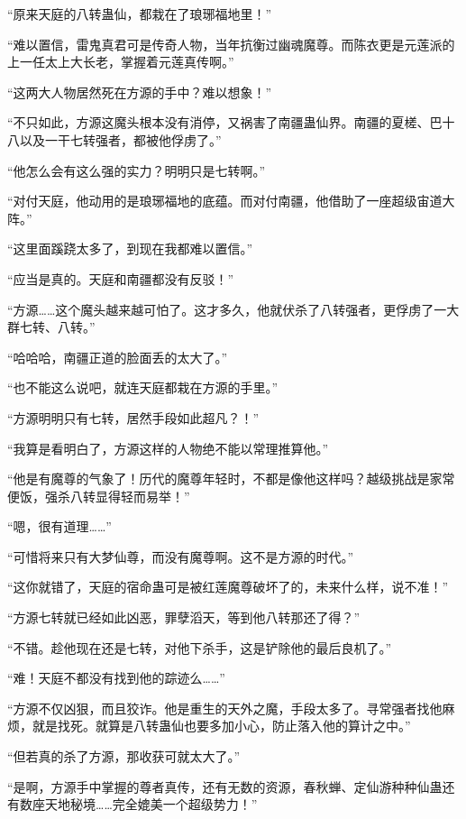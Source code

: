 
\begin{this_body}

“原来天庭的八转蛊仙，都栽在了琅琊福地里！”

“难以置信，雷鬼真君可是传奇人物，当年抗衡过幽魂魔尊。而陈衣更是元莲派的上一任太上大长老，掌握着元莲真传啊。”

“这两大人物居然死在方源的手中？难以想象！”

“不只如此，方源这魔头根本没有消停，又祸害了南疆蛊仙界。南疆的夏槎、巴十八以及一干七转强者，都被他俘虏了。”

“他怎么会有这么强的实力？明明只是七转啊。”

“对付天庭，他动用的是琅琊福地的底蕴。而对付南疆，他借助了一座超级宙道大阵。”

“这里面蹊跷太多了，到现在我都难以置信。”

“应当是真的。天庭和南疆都没有反驳！”

“方源……这个魔头越来越可怕了。这才多久，他就伏杀了八转强者，更俘虏了一大群七转、八转。”

“哈哈哈，南疆正道的脸面丢的太大了。”

“也不能这么说吧，就连天庭都栽在方源的手里。”

“方源明明只有七转，居然手段如此超凡？！”

“我算是看明白了，方源这样的人物绝不能以常理推算他。”

“他是有魔尊的气象了！历代的魔尊年轻时，不都是像他这样吗？越级挑战是家常便饭，强杀八转显得轻而易举！”

“嗯，很有道理……”

“可惜将来只有大梦仙尊，而没有魔尊啊。这不是方源的时代。”

“这你就错了，天庭的宿命蛊可是被红莲魔尊破坏了的，未来什么样，说不准！”

“方源七转就已经如此凶恶，罪孽滔天，等到他八转那还了得？”

“不错。趁他现在还是七转，对他下杀手，这是铲除他的最后良机了。”

“难！天庭不都没有找到他的踪迹么……”

“方源不仅凶狠，而且狡诈。他是重生的天外之魔，手段太多了。寻常强者找他麻烦，就是找死。就算是八转蛊仙也要多加小心，防止落入他的算计之中。”

“但若真的杀了方源，那收获可就太大了。”

“是啊，方源手中掌握的尊者真传，还有无数的资源，春秋蝉、定仙游种种仙蛊还有数座天地秘境……完全媲美一个超级势力！”


\end{this_body}
